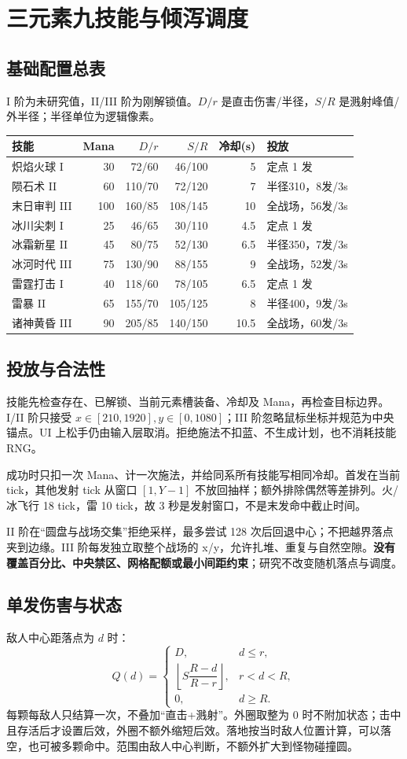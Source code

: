 \documentclass[UTF8,a4paper,11pt,fontset=windows]{ctexart}
\newcommand{\nextsection}[1]{\par\bigskip\section{#1}}
\begin{document}
\nextsection{三元素九技能与倾泻调度}
\subsection{基础配置总表}
I 阶为未研究值，II/III 阶为刚解锁值。$D/r$ 是直击伤害/半径，$S/R$ 是溅射峰值/外半径；半径单位为逻辑像素。
\begin{tabularx}{\linewidth}{@{}YrrrrP{33mm}@{}}
\toprule
技能 & Mana & $D/r$ & $S/R$ & 冷却(s) & 投放\\\midrule
炽焰火球 I & 30 & 72/60 & 46/100 & 5 & 定点 1 发\\
陨石术 II & 60 & 110/70 & 72/120 & 7 & 半径310，8发/3s\\
末日审判 III & 100 & 160/85 & 108/145 & 10 & 全战场，56发/3s\\
冰川尖刺 I & 25 & 46/65 & 30/110 & 4.5 & 定点 1 发\\
冰霜新星 II & 45 & 80/75 & 52/130 & 6.5 & 半径350，7发/3s\\
冰河时代 III & 75 & 130/90 & 88/155 & 9 & 全战场，52发/3s\\
雷霆打击 I & 40 & 118/60 & 78/105 & 6.5 & 定点 1 发\\
雷暴 II & 65 & 155/70 & 105/125 & 8 & 半径400，9发/3s\\
诸神黄昏 III & 90 & 205/85 & 140/150 & 10.5 & 全战场，60发/3s\\
\bottomrule
\end{tabularx}

\subsection{投放与合法性}
技能先检查存在、已解锁、当前元素槽装备、冷却及 Mana，再检查目标边界。I/II 阶只接受 $x\in[210,1920], y\in[0,1080]$；III 阶忽略鼠标坐标并规范为中央锚点。UI 上松手仍由输入层取消。拒绝施法不扣蓝、不生成计划，也不消耗技能 RNG。

成功时只扣一次 Mana、计一次施法，并给同系所有技能写相同冷却。首发在当前 tick，其他发射 tick 从窗口 $[1,Y-1]$ 不放回抽样；额外排除偶然等差排列。火/冰飞行 18 tick，雷 10 tick，故 3 秒是发射窗口，不是末发命中截止时间。

II 阶在“圆盘与战场交集”拒绝采样，最多尝试 128 次后回退中心；不把越界落点夹到边缘。III 阶每发独立取整个战场的 x/y，允许扎堆、重复与自然空隙。\textbf{没有覆盖百分比、中央禁区、网格配额或最小间距约束}；研究不改变随机落点与调度。

\subsection{单发伤害与状态}
敌人中心距落点为 $d$ 时：
\[
Q(d)=\begin{cases}
D,&d\leq r,\\
\left\lfloor S\dfrac{R-d}{R-r}\right\rfloor,&r<d<R,\\
0,&d\geq R.
\end{cases}
\]
每颗每敌人只结算一次，不叠加“直击+溅射”。外圈取整为 0 时不附加状态；击中且存活后才设置后效，外圈不额外缩短后效。落地按当时敌人位置计算，可以落空，也可被多颗命中。范围由敌人中心判断，不额外扩大到怪物碰撞圆。
\end{document}
